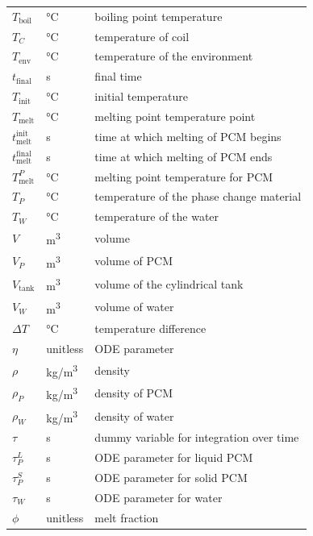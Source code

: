 \documentclass[12pt]{article}
\begin{document}
\begin{longtable*}{l l p{12cm}}
  \\
  $T_\text{boil}$ & \si[per-mode=symbol] {\celsius} & boiling point temperature
  \\
  $T_C$ &\si[per-mode=symbol] {\celsius} & temperature of coil
  \\
  $T_\text{env}$ & \si[per-mode=symbol] {\celsius} & temperature of the environment
  \\
  $t_\text{final}$ & \si[per-mode=symbol] {\second} & final time
  \\
  $T_\text{init}$ & \si[per-mode=symbol] {\celsius} & initial temperature
  \\
  $T_\text{melt}$ & \si[per-mode=symbol] {\celsius} & melting point temperature
  point
  \\
  $t_\text{melt}^\text{init}$ & \si[per-mode=symbol] {\second} & time at which
  melting of PCM begins
  \\
  $t_\text{melt}^\text{final}$ & \si[per-mode=symbol] {\second} & time at which
  melting of PCM ends
  \\
  $T_\text{melt}^{P}$ & \si[per-mode=symbol] {\celsius} & melting point temperature for PCM
  \\
  $T_P$ & \si[per-mode=symbol] {\celsius} & temperature of the phase change material
  \\
  $T_W$ & \si[per-mode=symbol] {\celsius} & temperature of the water
  \\
  $V$ & \si[per-mode=symbol] {\cubic\metre} & volume
  \\
  $V_P$ & \si[per-mode=symbol] {\cubic\metre} & volume of PCM
  \\
  $V_\text{tank}$ & \si[per-mode=symbol] {\cubic\metre} & volume of the
  cylindrical tank
  \\
  $V_W$ & \si[per-mode=symbol] {\cubic\metre} & volume of water
  \\
  $\Delta T$ & \si[per-mode=symbol] {\celsius} & temperature difference
  \\
  $\eta$ & \si[per-mode=symbol] {unitless} & ODE parameter
  \\
  $\rho$ & \si[per-mode=symbol] {\kilogram\per\cubic\metre} & density
  \\
  $\rho_P$ & \si[per-mode=symbol] {\kilogram\per\cubic\metre} & density of PCM
  \\
  $\rho_W$ & \si[per-mode=symbol] {\kilogram\per\cubic\metre} & density of water
  \\
  $\tau$ & \si[per-mode=symbol] {\second} & dummy variable for integration over
  time
  \\
  $\tau_P^L$ & \si[per-mode=symbol] {\second} & ODE parameter for liquid PCM
  \\
  $\tau_P^S$ & \si[per-mode=symbol] {\second} & ODE parameter for solid PCM
  \\
  $\tau_W$ & \si[per-mode=symbol] {\second} & ODE parameter for water
  \\
  $\phi$ & \si[per-mode=symbol] {unitless} & melt fraction
  \\
  \bottomrule
\end{longtable*}
\end{document}
